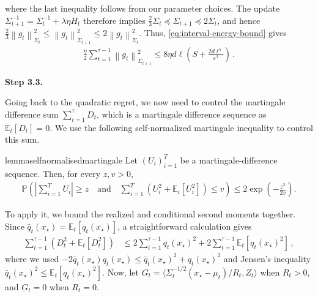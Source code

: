 \documentclass{article}
\newcommand{\proofstepinline}[1]{%
    {\normalfont\normalsize\bfseries\color{blue!55!black}Step #1.}\enspace
}
\newcommand{\E}{\mathbb E}
\newcommand{\Pp}{\mathbb P}
\newcommand{\1}{\mathbf 1}
\newcommand{\eps}{\varepsilon}
\newcommand{\normm}[2]{\left\lVert #1\right\rVert_{#2}}
\begin{document}
where the last inequality follows from our parameter choices.
The update $\Sigma_{t+1}^{-1}
    =\Sigma_t^{-1}+\lambda\eta H_t$ therefore implies
$\frac23\Sigma_t
    \preceq\Sigma_{t+1}
    \preceq2\Sigma_t$,
and hence
$
    \frac23\normm{g_t}{\Sigma_t}^2
    \leq\normm{g_t}{\Sigma_{t+1}}^2
    \leq2\normm{g_t}{\Sigma_t}^2
$.
Thus, \eqref{eq:interval-energy-bound} gives
\begin{align}
    \frac{\eta}{2}\sum_{t=1}^{\tau-1}\normm{g_t}{\Sigma_{t+1}}^2
    \leq
    8\eta d\ell
    \left(
    S + \frac{2d\ell^5}{\eps^2}
    \right)\,.
\end{align}

\proofstepinline{3.3}
Going back to the quadratic regret, we now need to control the martingale difference sum $\sum_{t=1}^{\tau}D_t$, which is a martingale difference sequence as $\E_t[D_t]=0$.
We use the following self-normalized martingale inequality \citet[Theorem~3.26]{bercu2015concentration} to control this sum.
\begin{restatable}{lemma}{selfnormalisedmartingale}
    \label{lem:self-normalised-martingale}
    Let $(U_i)_{i=1}^T$ be a martingale-difference sequence. Then, for every $z,v>0$,
    \begin{align}
        \Pp\left(
        \left|\sum_{i=1}^T U_i\right|\geq z\quad\text{and}\quad
        \sum_{i=1}^T \left(U_i^2+\E_i[U_i^2]\right)\leq v
        \right)
        \leq
        2\exp\left(-\frac{z^2}{2v}\right).
        \label{eq:self-normalised-martingale}
    \end{align}
\end{restatable}
To apply it, we bound the realized and conditional second moments together.
Since $\bar{q}_t(x_{\star})=\E_t[q_t(x_\star)]$, a straightforward calculation gives
\begin{align}
    \sum_{t=1}^{\tau-1}\left(D_t^2+\E_t[D_t^2]\right)
     & \leq
    2\sum_{t=1}^{\tau-1}
    q_t(x_{\star})^2
    +
    2\sum_{t=1}^{\tau-1}
    \E_t[q_t(x_{\star})^2]\,,
    \label{eq:martingale-variance}
\end{align}
where we used $-2\bar{q}_t(x_{\star})q_t(x_{\star}) \leq \bar{q}_t(x_{\star})^2+q_t(x_{\star})^2$ and Jensen's inequality
$\bar{q}_t(x_{\star})^2\leq\E_t[q_t(x_{\star})^2]$.
Now, let $G_t = \langle \Sigma_t^{-1/2}(x_\star-\mu_t)/R_t, Z_t\rangle$
when $R_t>0$, and $G_t = 0$ when $R_t=0$.
\end{document}
